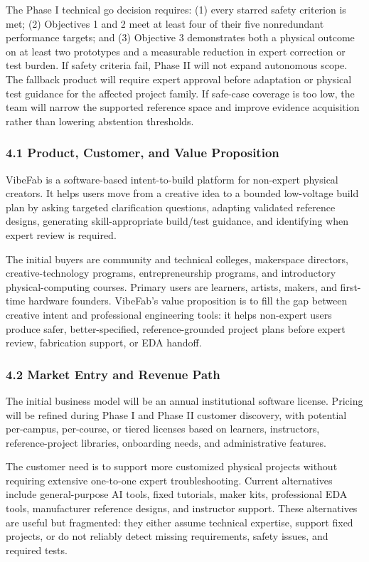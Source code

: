 The Phase I technical go decision requires: (1) every starred safety criterion is met; (2) Objectives 1 and 2 meet at least four of their five nonredundant performance targets; and (3) Objective 3 demonstrates both a physical outcome on at least two prototypes and a measurable reduction in expert correction or test burden. If safety criteria fail, Phase II will not expand autonomous scope. The fallback product will require expert approval before adaptation or physical test guidance for the affected project family. If safe-case coverage is too low, the team will narrow the supported reference space and improve evidence acquisition rather than lowering abstention thresholds.



\subsubsection*{4.1 Product, Customer, and Value Proposition}

VibeFab is a software-based intent-to-build platform for non-expert physical creators. It helps users move from a creative idea to a bounded low-voltage build plan by asking targeted clarification questions, adapting validated reference designs, generating skill-appropriate build/test guidance, and identifying when expert review is required.

The initial buyers are community and technical colleges, makerspace directors, creative-technology programs, entrepreneurship programs, and introductory physical-computing courses. Primary users are learners, artists, makers, and first-time hardware founders. VibeFab's value proposition is to fill the gap between creative intent and professional engineering tools: it helps non-expert users produce safer, better-specified, reference-grounded project plans before expert review, fabrication support, or EDA handoff.

\subsubsection*{4.2 Market Entry and Revenue Path}

The initial business model will be an annual institutional software license. Pricing will be refined during Phase I and Phase II customer discovery, with potential per-campus, per-course, or tiered licenses based on learners, instructors, reference-project libraries, onboarding needs, and administrative features.

The customer need is to support more customized physical projects without requiring extensive one-to-one expert troubleshooting. Current alternatives include general-purpose AI tools, fixed tutorials, maker kits, professional EDA tools, manufacturer reference designs, and instructor support. These alternatives are useful but fragmented: they either assume technical expertise, support fixed projects, or do not reliably detect missing requirements, safety issues, and required tests.

